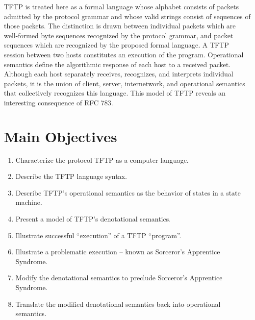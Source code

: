 \documentclass[a0,landscape]{a0poster}
\begin{document}
\begin{multicols}{4}
TFTP is treated here as a formal language whose alphabet consists of packets admitted by the protocol grammar and whose valid strings consist of sequences of those packets. The distinction is drawn between individual packets which are well-formed byte sequences recognized by the protocol grammar, and packet sequences which are recognized by the proposed formal language. A TFTP session between two hosts constitutes an execution of the program. Operational semantics define the algorithmic response of each host to a received packet. Although each host separately receives, recognizes, and interprets individual packets, it is the union of client, server, internetwork, and operational semantics that collectively recognizes this language. This model of TFTP reveals an interesting consequence of RFC 783.


\color{DarkSlateGray} %

\section*{Main Objectives}

\begin{enumerate}
\item Characterize the protocol TFTP as a computer language.
\item Describe the TFTP language syntax.
\item Describe TFTP's operational semantics as the behavior of states in a state machine.
\item Present a model of TFTP's denotational semantics.
\item Illustrate successful ``execution'' of a TFTP ``program''.
\item Illustrate a problematic execution -- known as Sorceror's Apprentice Syndrome.
\item Modify the denotational semantics to preclude Sorceror's Apprentice Syndrome.
\item Translate the modified denotational semantics back into operational semantics.
\end{enumerate}



\end{multicols}
\end{document}
